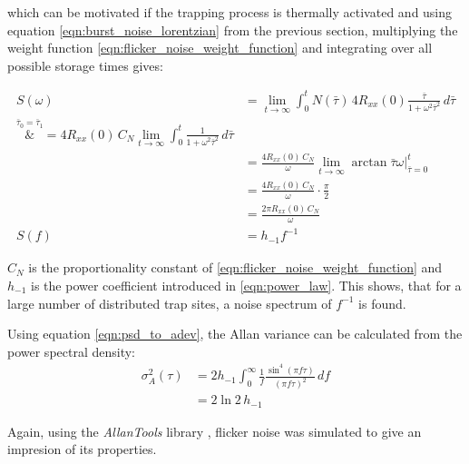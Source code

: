 which can be motivated if the trapping process is thermally activated \cite{1_f_noise_motivation} and using equation \ref{eqn:burst_noise_lorentzian} from the previous section, multiplying the weight function \ref{eqn:flicker_noise_weight_function} and integrating over all possible storage times gives:

\begin{align}
    S(\omega) &= \lim_{t \to \infty} \int_0^t N(\bar \tau) \, 4 R_{xx}(0) \frac{\bar \tau}{1 + \omega^2 \bar \tau^2} \, d\bar\tau \nonumber\\
    \overset{\bar \tau_0 = \bar \tau_1}&{=} 4 R_{xx}(0)\, C_N \lim_{t \to \infty} \int_0^t \frac{1}{1 + \omega^2 \bar\tau^2} \, d\bar\tau \nonumber\\
    &= \frac{4 R_{xx}(0)\, C_N}{\omega} \lim_{t \to \infty}  \arctan{\bar\tau \omega} \Big|_{\bar\tau=0}^t \nonumber\\
    &= \frac{4 R_{xx}(0)\, C_N}{\omega} \cdot \frac{\pi}{2} \nonumber\\
    &= \frac{2 \pi R_{xx}(0)\, C_N}{\omega}\\
    S(f) &= h_{-1} f^{-1}
\end{align}

$C_N$ is the proportionality constant of \ref{eqn:flicker_noise_weight_function} and $h_{-1}$ is the power coefficient introduced in \ref{eqn:power_law}. This shows, that for a large number of distributed trap sites, a noise spectrum of $f^{-1}$ is found.

Using equation \ref{eqn:psd_to_adev}, the Allan variance can be calculated from the power spectral density:
\begin{align}
    \sigma_A^2(\tau) &= 2 h_{-1} \int_0^\infty \frac{1}{f} \frac{\sin^4\left( \pi f \tau \right)}{(\pi f \tau)^2}\,df \nonumber\\
    &=2 \ln 2 \, h_{-1}
\end{align}

Again, using the \textit{AllanTools} library \cite{allantools}, flicker noise was simulated to give an impresion of its properties.

